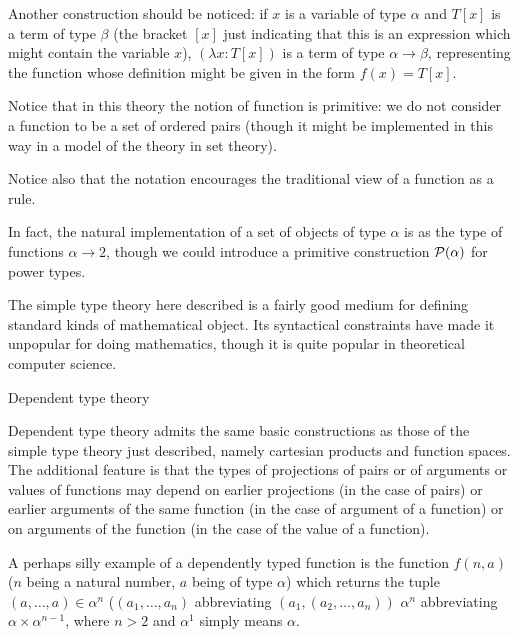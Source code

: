 \documentclass[12pt]{slides}
\begin{document}
\begin{slide}


Another construction should be noticed:  if $x$ is a variable of type $\alpha$ and $T[x]$ is a term of type $\beta$ (the bracket $[x]$ just indicating that this is an expression which might contain the variable $x$),
$(\lambda x:T[x])$ is a term of type $\alpha \rightarrow \beta$, representing the function whose definition might be given in the form $f(x)=T[x]$.

Notice that in this theory the notion of function is primitive:  we do not consider a function to be a set of ordered pairs (though it might be implemented
in this way in a model of the theory in set theory).

Notice also that the notation encourages the traditional view of a function as a rule.

In fact, the natural implementation of a set of objects of type $\alpha$ is as the type of functions $\alpha \rightarrow 2$, though we could introduce a primitive construction ${\cal P}(\alpha)$ for power types.

\end{slide}

\begin{slide}

The simple type theory here described is a fairly good medium for defining standard kinds of mathematical object.  Its syntactical constraints have made it unpopular for doing mathematics, though it is quite popular in theoretical computer science.

\end{slide}

\begin{slide}

{\Large Dependent type theory}

Dependent type theory admits the same basic constructions as those of the simple type theory just described, namely cartesian products and function spaces.  The additional feature is that the types of projections of pairs or of arguments or values of functions may depend on earlier projections (in the case of
pairs) or earlier arguments of the same function (in the case of argument of a function) or on arguments of the function (in the case of the value of a function).

A perhaps silly example of a dependently typed function is the function $f(n,a)$ ($n$ being a natural number, $a$ being of type $\alpha$) which returns
the tuple $(a,\ldots,a) \in \alpha^n$ ($(a_1,\ldots,a_n)$ abbreviating $(a_1,(a_2,\ldots,a_n))$ $\alpha^n$ abbreviating $\alpha \times \alpha^{n-1}$, where $n >2$ and  $\alpha^1$ simply means $\alpha$.


\end{slide}
\end{document}
